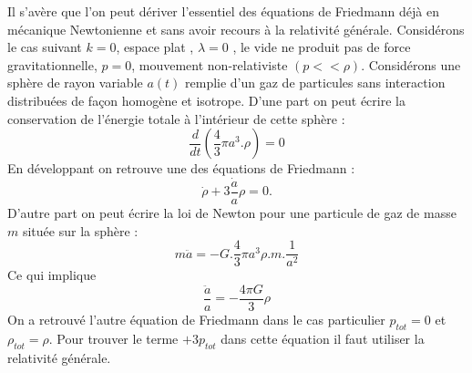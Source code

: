 \documentclass[a4paper,12pt]{report}
\theoremstyle{plain}
\theoremstyle{plain}
\begin{document}
 Il s'av\`ere que l'on peut d\'eriver l'essentiel des \'equations de Friedmann d\'ej\`a en m\'ecanique Newtonienne et sans avoir recours \`a la relativit\'e g\'en\'erale. Consid\'erons le cas suivant 
  	$ k=0$, espace plat , 
  	$\lambda =0 $ , le vide ne produit pas de force gravitationnelle, 
  	$  p=0$, mouvement non-relativiste $(p<< \rho ). $ 
Consid\'erons une sph\`ere de rayon variable $a(t)$ remplie d'un gaz de particules sans interaction distribu\'ees de fa\c con homog\`ene et isotrope. D'une part on peut \'ecrire la conservation de l'\'energie totale \`a l'int\'erieur de cette sph\`ere :
 \begin{equation}
\frac{d}{dt}\left(  \frac{4}{3} \pi a^3 . \rho  \right) =0 
 \end{equation} 
 En d\'eveloppant on retrouve une des \'equations de Friedmann : 
 \begin{equation}
 \dot{\rho} + 3 \frac{\dot{a}}{a} \rho =0. 
 \end{equation}
 D'autre part on peut \'ecrire la loi de Newton pour une particule de gaz de masse $m$ situ\'ee sur la sph\`ere :
 \begin{equation}
 m \ddot{a} = -G . \frac{4}{3} \pi a^3 \rho .m. \frac{1}{a^2}
 \end{equation}
  Ce qui implique 
  \begin{equation}
  \frac{\ddot{a}}{a} = - \frac{4 \pi G}{3} \rho 
  \end{equation} 
  On a retrouv\'e l'autre \'equation de Friedmann dans le cas particulier $p_{tot} =0$ et $\rho_{tot}=\rho $. Pour trouver le terme $+3 p_{tot}$ dans cette \'equation il faut utiliser la relativit\'e g\'en\'erale.
\end{document}

